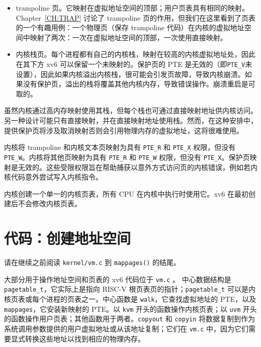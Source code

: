 \begin{itemize}
  
\item trampoline 页。它映射在虚拟地址空间的顶部；用户页表具有相同的映射。Chapter~\ref{CH:TRAP} 讨论了 trampoline 页的作用，但我们在这里看到了页表的一个有趣用例：一个物理页（保存 trampoline 代码）在内核的虚拟地址空间中映射了两次：一次在虚拟地址空间的顶部，一次使用直接映射。

\item 内核栈页。每个进程都有自己的内核栈，映射在较高的内核虚拟地址处，因此在其下方 xv6 可以保留一个未映射的。保护页的 PTE 是无效的（即\lstinline{PTE_V}未设置），因此如果内核溢出内核栈，很可能会引发页故障，导致内核崩溃。如果没有保护页，溢出的栈将覆盖其他内核内存，导致错误操作。崩溃重启是可取的。

\end{itemize}

虽然内核通过高内存映射使用其栈，但每个栈也可通过直接映射地址供内核访问。另一种设计可能只有直接映射，并在直接映射地址使用栈。然而，在这种安排中，提供保护页将涉及取消映射否则会引用物理内存的虚拟地址，这将很难使用。

内核将 trampoline 和内核文本页映射为具有 \lstinline{PTE_R} 和 \lstinline{PTE_X} 权限，但没有 \lstinline{PTE_W}。内核将其他页映射为具有 \lstinline{PTE_R} 和 \lstinline{PTE_W} 权限，但没有 \lstinline{PTE_X}。保护页映射是无效的。这些受限权限旨在帮助捕获以意外方式访问页的内核错误，例如若内核代码意外尝试写入内核指令。

内核创建一个单一的内核页表，所有 CPU 在内核中执行时使用它。xv6 在最初创建后不会修改内核页表。

\section{代码：创建地址空间}

请在继续之前阅读 {\tt kernel/vm.c} 到 {\tt mappages()} 的结尾。

大部分用于操作地址空间和页表的 xv6 代码位于 {\tt vm.c}
。
中心数据结构是 {\tt pagetable\_t}，它实际上是指向 RISC-V 根页表页的指针；{\tt pagetable\_t} 可以是内核页表或每个进程的页表之一。中心函数是 {\tt walk}，它查找虚拟地址的 PTE，以及 {\tt mappages}，它安装新映射的 PTE。以 {\tt kvm} 开头的函数操作内核页表；以 {\tt uvm} 开头的函数操作用户页表；其他函数用于两者。{\tt copyout} 和 {\tt copyin} 将数据复制到作为系统调用参数提供的用户虚拟地址或从该地址复制；它们在 {\tt vm.c} 中，因为它们需要显式转换这些地址以找到相应的物理内存。

